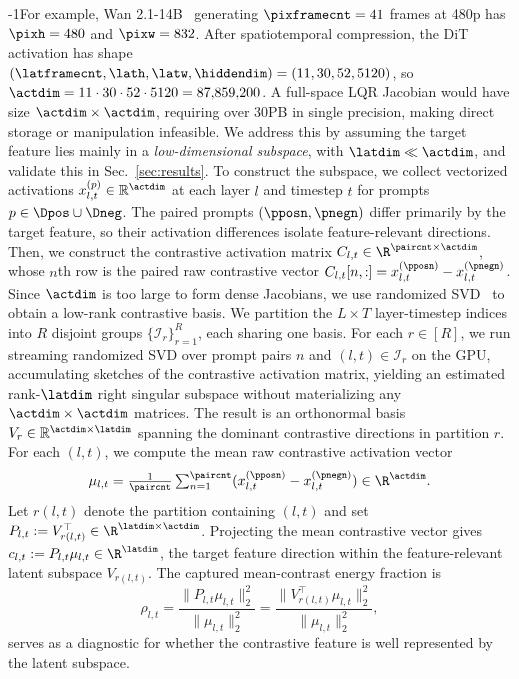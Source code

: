 \documentclass{article}
\begin{document}
\looseness-1For example, Wan 2.1-14B~\cite{wan2025wan} generating $\pixframecnt=41$ frames at 480p has $\pixh=480$ and $\pixw=832$. After spatiotemporal compression, the DiT activation has shape $(\latframecnt,\lath,\latw,\hiddendim)=(11,30,52,5120)$, so 
$\actdim = 11\cdot 30\cdot 52\cdot 5120 = 87{,}859{,}200$. 
A full-space LQR Jacobian would have size $\actdim\times\actdim$, requiring over 30PB in single precision, making direct storage or manipulation infeasible. 
We address this by assuming the target feature lies mainly in a \textit{low-dimensional subspace}, with $\latdim\ll\actdim$, and validate this in Sec.~\ref{sec:results}. To construct the subspace, we collect vectorized activations $x_{l,t}^{(p)}\in\mathbb{R}^{\actdim}$ at each layer $l$ and timestep $t$ for prompts $p\in\Dpos\cup\Dneg$. The paired prompts $(\pposn,\pnegn)$ differ primarily by the target feature, so their activation differences isolate feature-relevant directions. 
Then, we construct the contrastive activation matrix $C_{l,t}\in\R^{\paircnt\times\actdim}$, whose $n$th row is the paired raw contrastive vector $C_{l,t}[n,:] = x_{l,t}^{(\pposn)}-x_{l,t}^{(\pnegn)}$. 
Since $\actdim$ is too large to form dense Jacobians, we use randomized SVD~\cite{halko2011finding} to obtain a low-rank contrastive basis. We partition the $L\times T$ layer-timestep indices into $R$ disjoint groups $\{\mathcal{I}_r\}_{r=1}^R$, each sharing one basis. For each $r\in[R]$, we run streaming randomized SVD over prompt pairs $n$ and 
$(l,t)\in\mathcal{I}_r$ on the GPU, accumulating sketches of the contrastive activation matrix, yielding an estimated rank-$\latdim$ right singular subspace without materializing any $\actdim\times\actdim$ matrices. The result is an orthonormal basis $ V_r \in \mathbb{R}^{\actdim\times \latdim}$ spanning the dominant contrastive directions in partition $r$. For each $(l,t)$, we compute the mean raw contrastive activation vector 
\begin{equation}\label{eq:mean_contrastive}
    \mu_{l,t}
    =
    \textstyle\frac{1}{\paircnt}
    \sum_{n=1}^{\paircnt}
    (x_{l,t}^{(\pposn)}-x_{l,t}^{(\pnegn)})
    \in \R^{\actdim}.%
\end{equation}
Let $r(l,t)$ denote the partition containing $(l,t)$ and set
$P_{l,t}:=V_{r(l,t)}^\top\in\R^{\latdim\times\actdim}$. Projecting the
mean contrastive vector gives
$c_{l,t}:=P_{l,t}\mu_{l,t}\in\R^{\latdim}$, the target feature direction
within the feature-relevant latent subspace $V_{r(l,t)}$. The captured
mean-contrast energy fraction is
\begin{equation}\label{eq:energy}
    \textstyle\rho_{l,t}
    =
    \frac{\|P_{l,t}\mu_{l,t}\|_2^2}{\|\mu_{l,t}\|_2^2}
    =
    \frac{\|V_{r(l,t)}^\top \mu_{l,t}\|_2^2}{\|\mu_{l,t}\|_2^2},
\end{equation}
serves as a diagnostic for whether the contrastive feature is well represented by the latent subspace.
\end{document}
